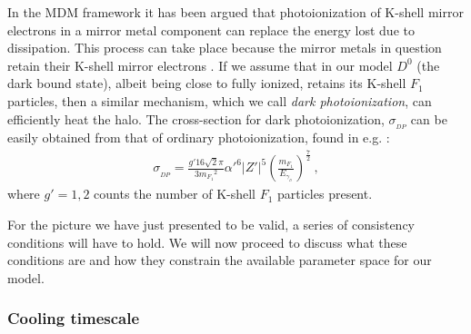 \documentclass[12pt]{article}
\begin{document}
{{In the MDM framework it has been argued that photoionization of K-shell mirror electrons in a mirror metal component can replace the energy lost due to dissipation. This process can take place because the mirror metals in question retain their K-shell mirror electrons \cite{review}. If we assume that in our model $D ^0$ (the dark bound state), albeit being close to fully ionized, retains its K-shell $F _1$ particles, then a similar mechanism, which we call \textit{dark photoionization}, can efficiently heat the halo. The cross-section for dark photoionization, $\sigma _{_{DP}}$ can be easily obtained from that of ordinary photoionization, found in e.g. \cite{radiative}:
%
\begin{eqnarray}
\sigma _{_{DP}} = \frac{g'16\sqrt{2}\pi}{3 {m _{F_1}} ^2} {\alpha '} ^6 {|Z'|} ^5 \left ( \frac{m _{F_1}}{E _{\gamma _{_D}}} \right ) ^{\frac{7}{2}} \ ,
\label{photoionization}
\end{eqnarray}
%
where $g' = 1,2$ counts the number of K-shell $F_1$ particles present.

For the picture we have just presented to be valid, a series of consistency conditions will have to hold. We will now proceed to discuss what these conditions are and how they constrain the available parameter space for our model.

\subsubsection{Cooling timescale}

}}
\end{document}
